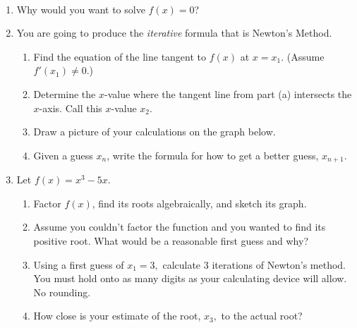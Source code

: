 \documentclass[11pt,fleqn]{article}
\newcommand{\be}{\begin{enumerate}}
\newcommand{\ee}{\end{enumerate}}
\begin{document}
\vspace*{-0.7in}

\begin{center}
  \Large{}\\
\end{center}
\begin{enumerate}
\item Why would you want to solve $f(x)=0$?
\vspace{1in}
\item You are going to produce the \emph{iterative} formula that is Newton's Method.
	\begin{enumerate}
	\item Find the equation of the line tangent to $f(x)$ at $x=x_1.$ (Assume $f'(x_1) \not = 0.$)
	\vfill
	\item Determine the $x$-value where the tangent line from part (a) intersects the $x$-axis. Call this $x$-value $x_2$.
	\vfill
	\item Draw a picture of your calculations on the graph below.\\
\item Given a guess $x_n$, write the formula for how to get a better guess, $x_{n+1}.$
\vspace{.5in}
\newpage
	\end{enumerate}
\item {} Let $f(x)=x^3-5x.$\\
\be
\item Factor $f(x)$, find its roots algebraically, and sketch its graph.
\vspace{3in}
\item Assume you couldn't factor the function and you wanted to find its positive root. What would be a reasonable first guess and why?
\vspace{1in}
\item Using a first guess of $x_1=3,$ calculate 3 iterations of Newton's method. You must hold onto as many digits as your calculating device will allow. No rounding.
\vfill
\item How close is your estimate of the root, $x_3,$ to the actual root?
\vspace{0.25in}
\ee

\end{enumerate}
\end{document}
